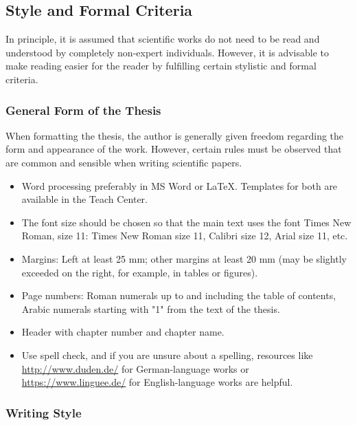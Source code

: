 \subsection{Style and Formal Criteria}
\label{sec:styleAndFormalCriteria}

In principle, it is assumed that scientific works do not need to be read and understood by completely non-expert individuals. However, it is advisable to make reading easier for the reader by fulfilling certain stylistic and formal criteria.


\subsubsection{General Form of the Thesis}
\label{sec:generalFormOfTheThesis}

When formatting the thesis, the author is generally given freedom regarding the form and appearance of the work. However, certain rules must be observed that are common and sensible when writing scientific papers.

\begin{itemize}
    \item Word processing preferably in MS Word or LaTeX. Templates for both are available in the Teach Center.
    \item The font size should be chosen so that the main text uses the font Times New Roman, size 11: Times New Roman size 11, Calibri size 12, Arial size 11, etc.
    \item Margins: Left at least 25 mm; other margins at least 20 mm (may be slightly exceeded on the right, for example, in tables or figures).
    \item Page numbers: Roman numerals up to and including the table of contents, Arabic numerals starting with "1" from the text of the thesis.
    \item Header with chapter number and chapter name.
    \item Use spell check, and if you are unsure about a spelling, resources like \url{http://www.duden.de/} for German-language works or \url{https://www.linguee.de/} for English-language works are helpful.
\end{itemize}


\subsubsection{Writing Style}
\label{sec:writingStyle}

